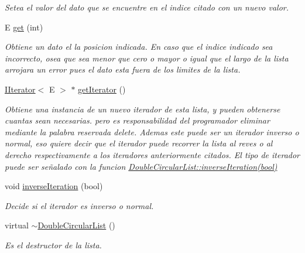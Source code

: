 \begin{DoxyCompactItemize}
\begin{DoxyCompactList}\small\item\em Setea el valor del dato que se encuentre en el indice citado con un nuevo valor. \end{DoxyCompactList}\item 
E \hyperlink{class_double_circular_list_aa00bc8fd524af1ba208f85d8816dec52}{get} (int)
\begin{DoxyCompactList}\small\item\em Obtiene un dato el la posicion indicada. En caso que el indice indicado sea incorrecto, osea que sea menor que cero o mayor o igual que el largo de la lista arrojara un error pues el dato esta fuera de los limites de la lista. \end{DoxyCompactList}\item 
\hyperlink{class_i_iterator}{I\-Iterator}$<$ E $>$ $\ast$ \hyperlink{class_double_circular_list_abba1430e956c7660a88f786bfd8d87ad}{get\-Iterator} ()
\begin{DoxyCompactList}\small\item\em Obtiene una instancia de un nuevo iterador de esta lista, y pueden obtenerse cuantas sean necesarias. pero es responsabilidad del programador eliminar mediante la palabra reservada delete. Ademas este puede ser un iterador inverso o normal, eso quiere decir que el iterador puede recorrer la lista al reves o al derecho respectivamente a los iteradores anteriormente citados. El tipo de iterador puede ser señalado con la funcion \hyperlink{class_double_circular_list_a77212c5d6ad148c99a06009a8c44128b}{Double\-Circular\-List\-::inverse\-Iteration(bool)}\end{DoxyCompactList}\item 
void \hyperlink{class_double_circular_list_a77212c5d6ad148c99a06009a8c44128b}{inverse\-Iteration} (bool)
\begin{DoxyCompactList}\small\item\em Decide si el iterador es inverso o normal. \end{DoxyCompactList}\item 
\hypertarget{class_double_circular_list_a26dba8b85983742cfbf38886245fe2a4}{virtual \hyperlink{class_double_circular_list_a26dba8b85983742cfbf38886245fe2a4}{$\sim$\-Double\-Circular\-List} ()}\label{class_double_circular_list_a26dba8b85983742cfbf38886245fe2a4}

\begin{DoxyCompactList}\small\item\em Es el destructor de la lista. \end{DoxyCompactList}\end{DoxyCompactItemize}
